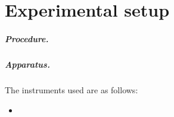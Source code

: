 \chapter{Experimental setup}


\paragraph{Procedure.}

\paragraph{Apparatus.}
The instruments used are as follows:

\begin{itemize}
    \item 
\end{itemize}


